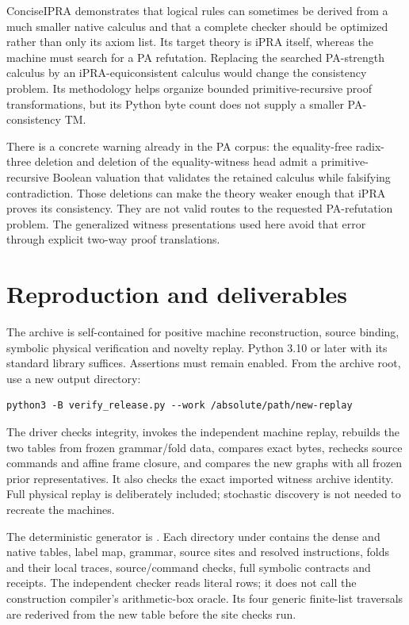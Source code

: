 \documentclass[10pt,letterpaper]{article}
\newcommand{\file}[1]{\path{#1}}
\begin{document}
ConciseIPRA demonstrates that logical rules can sometimes be derived
from a much smaller native calculus and that a complete checker should
be optimized rather than only its axiom list.  Its target theory is
iPRA itself, whereas the machine must search for a PA refutation.
Replacing the searched PA-strength calculus by an iPRA-equiconsistent
calculus would change the consistency problem.  Its methodology helps
organize bounded primitive-recursive proof transformations, but its
Python byte count does not supply a smaller PA-consistency TM.

There is a concrete warning already in the PA corpus: the equality-free
radix-three deletion and deletion of the equality-witness head admit a
primitive-recursive Boolean valuation that validates the retained
calculus while falsifying contradiction.  Those deletions can make the
theory weaker enough that iPRA proves its consistency.  They are not
valid routes to the requested PA-refutation problem.  The generalized
witness presentations used here avoid that error through explicit
two-way proof translations.

\section{Reproduction and deliverables}

The archive is self-contained for positive machine reconstruction,
source binding, symbolic physical verification and novelty replay.
Python 3.10 or later with its standard library suffices.  Assertions
must remain enabled.  From the archive root, use a new output directory:
\begin{verbatim}
python3 -B verify_release.py --work /absolute/path/new-replay
\end{verbatim}
The driver checks integrity, invokes the independent machine replay,
rebuilds the two tables from frozen grammar/fold data, compares exact
bytes, rechecks source commands and affine frame closure, and compares
the new graphs with all frozen prior representatives.  It also checks
the exact imported witness archive identity.  Full physical replay is
deliberately included; stochastic discovery is not needed to recreate
the machines.

The deterministic generator is \file{construction/build_symmetric.py}.
Each directory under \file{machines/} contains the dense and native
tables, label map, grammar, source sites and resolved instructions,
folds and their local traces, source/command checks, full symbolic
contracts and receipts.  The independent checker reads literal rows;
it does not call the construction compiler's arithmetic-box oracle.
Its four generic finite-list traversals are rederived from the new
table before the site checks run.
\end{document}
